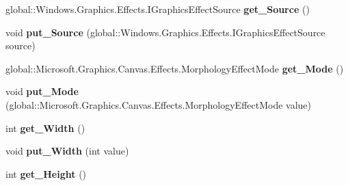 \begin{DoxyCompactItemize}
global\+::\+Windows.\+Graphics.\+Effects.\+I\+Graphics\+Effect\+Source {\bfseries get\+\_\+\+Source} ()
\item 
\mbox{\label{interface_microsoft_1_1_graphics_1_1_canvas_1_1_effects_1_1_i_morphology_effect_a6aba3568850c2df11ccf1005f5ecfbca}} 
void {\bfseries put\+\_\+\+Source} (global\+::\+Windows.\+Graphics.\+Effects.\+I\+Graphics\+Effect\+Source source)
\item 
\mbox{\label{interface_microsoft_1_1_graphics_1_1_canvas_1_1_effects_1_1_i_morphology_effect_a4625903e2e2033038f140f494007ccef}} 
global\+::\+Microsoft.\+Graphics.\+Canvas.\+Effects.\+Morphology\+Effect\+Mode {\bfseries get\+\_\+\+Mode} ()
\item 
\mbox{\label{interface_microsoft_1_1_graphics_1_1_canvas_1_1_effects_1_1_i_morphology_effect_ae67e959972393bca5d6e02aa06cd227b}} 
void {\bfseries put\+\_\+\+Mode} (global\+::\+Microsoft.\+Graphics.\+Canvas.\+Effects.\+Morphology\+Effect\+Mode value)
\item 
\mbox{\label{interface_microsoft_1_1_graphics_1_1_canvas_1_1_effects_1_1_i_morphology_effect_a30eb746728372b5fdd4c6e783b9a3545}} 
int {\bfseries get\+\_\+\+Width} ()
\item 
\mbox{\label{interface_microsoft_1_1_graphics_1_1_canvas_1_1_effects_1_1_i_morphology_effect_ac8928007cf4daceb6edf45df25104160}} 
void {\bfseries put\+\_\+\+Width} (int value)
\item 
\mbox{\label{interface_microsoft_1_1_graphics_1_1_canvas_1_1_effects_1_1_i_morphology_effect_a894c0a79c2bf5a0314930c5c502a7662}} 
int {\bfseries get\+\_\+\+Height} ()
\item 
\mbox{\label{interface_microsoft_1_1_graphics_1_1_canvas_1_1_effects_1_1_i_morphology_effect_aefc8baeb4576bca214b2862f5b188ff8}} 

\end{DoxyCompactItemize}
